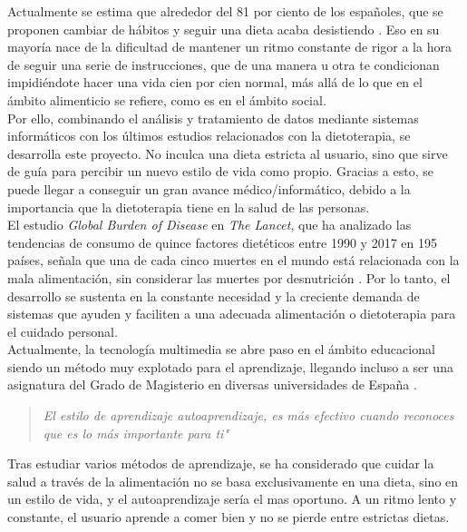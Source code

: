 
Actualmente se estima que alrededor del 81 por ciento de los españoles, que se proponen cambiar de hábitos y seguir una dieta acaba desistiendo \cite{81abandona}. Eso en su mayoría nace de la dificultad de mantener un ritmo constante de rigor a la hora de seguir una serie de instrucciones, que de una manera u otra te condicionan impidiéndote hacer una vida cien por cien normal, más allá de lo que en el ámbito alimenticio se refiere, como es en el ámbito social. \\

Por ello, combinando el análisis y tratamiento de datos mediante sistemas informáticos con los últimos estudios relacionados con la dietoterapia, se desarrolla este proyecto. No inculca una dieta estricta al usuario, sino que sirve de guía para percibir un nuevo estilo de vida como propio. Gracias a esto, se puede llegar a conseguir un gran avance médico/informático, debido a la importancia que la dietoterapia tiene en la salud de las personas. \\

El estudio \textit{Global Burden of Disease} en \textit{The Lancet}, que ha analizado las tendencias de consumo de quince factores dietéticos entre 1990 y 2017 en 195 países, señala que una de cada cinco muertes en el mundo está relacionada con la mala alimentación, sin considerar las muertes por desnutrición \cite{thelancet}. Por lo tanto, el desarrollo se sustenta en la constante necesidad y la creciente demanda de sistemas que ayuden y faciliten a una adecuada alimentación o dietoterapia para el cuidado personal.\\

Actualmente, la tecnología multimedia se abre paso en el ámbito educacional siendo un método muy explotado para el aprendizaje, llegando incluso a ser una asignatura del Grado de Magisterio en diversas universidades de España  \cite{multimedia}. \\

\begin{quote}
\textit{El estilo de aprendizaje autoaprendizaje, es más efectivo cuando reconoces que es lo más importante para ti"}
\cite{autoaprendizaje}
\end{quote}
Tras estudiar varios métodos de aprendizaje, se ha considerado que cuidar la salud a través de la alimentación no se basa exclusivamente en una dieta, sino en un estilo de vida, y el autoaprendizaje sería el mas oportuno. A un ritmo lento y constante, el usuario aprende a comer bien y no se pierde entre estrictas dietas.\\

